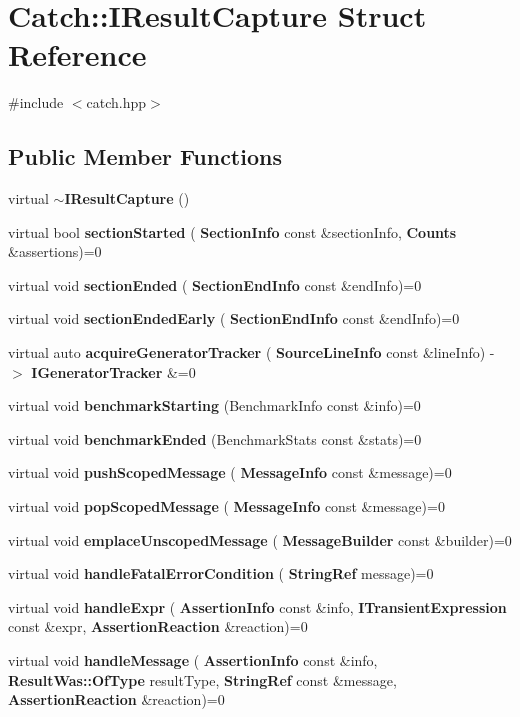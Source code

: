 \section{Catch\+::I\+Result\+Capture Struct Reference}
\label{struct_catch_1_1_i_result_capture}


{\ttfamily \#include $<$catch.\+hpp$>$}

\subsection*{Public Member Functions}
\begin{DoxyCompactItemize}
\item 
virtual \textbf{ $\sim$\+I\+Result\+Capture} ()
\item 
virtual bool \textbf{ section\+Started} (\textbf{ Section\+Info} const \&section\+Info, \textbf{ Counts} \&assertions)=0
\item 
virtual void \textbf{ section\+Ended} (\textbf{ Section\+End\+Info} const \&end\+Info)=0
\item 
virtual void \textbf{ section\+Ended\+Early} (\textbf{ Section\+End\+Info} const \&end\+Info)=0
\item 
virtual auto \textbf{ acquire\+Generator\+Tracker} (\textbf{ Source\+Line\+Info} const \&line\+Info) -\/$>$ \textbf{ I\+Generator\+Tracker} \&=0
\item 
virtual void \textbf{ benchmark\+Starting} (Benchmark\+Info const \&info)=0
\item 
virtual void \textbf{ benchmark\+Ended} (Benchmark\+Stats const \&stats)=0
\item 
virtual void \textbf{ push\+Scoped\+Message} (\textbf{ Message\+Info} const \&message)=0
\item 
virtual void \textbf{ pop\+Scoped\+Message} (\textbf{ Message\+Info} const \&message)=0
\item 
virtual void \textbf{ emplace\+Unscoped\+Message} (\textbf{ Message\+Builder} const \&builder)=0
\item 
virtual void \textbf{ handle\+Fatal\+Error\+Condition} (\textbf{ String\+Ref} message)=0
\item 
virtual void \textbf{ handle\+Expr} (\textbf{ Assertion\+Info} const \&info, \textbf{ I\+Transient\+Expression} const \&expr, \textbf{ Assertion\+Reaction} \&reaction)=0
\item 
virtual void \textbf{ handle\+Message} (\textbf{ Assertion\+Info} const \&info, \textbf{ Result\+Was\+::\+Of\+Type} result\+Type, \textbf{ String\+Ref} const \&message, \textbf{ Assertion\+Reaction} \&reaction)=0

\end{DoxyCompactItemize}
